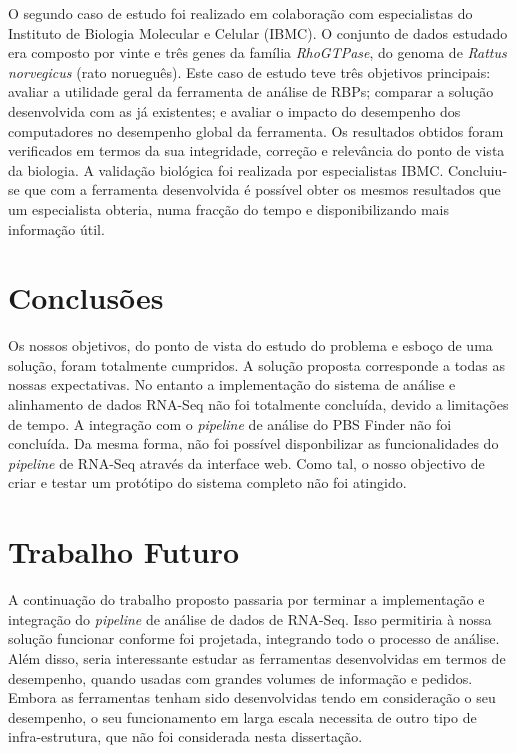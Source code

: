 \documentclass[9pt,a4paper]{extarticle}
\begin{document}
\begin{multicols}{2}
O segundo caso de estudo foi realizado em colaboração com especialistas do
Instituto de Biologia Molecular e Celular (IBMC). O conjunto de dados estudado
era composto por vinte e três genes da família \emph{RhoGTPase}, do genoma de
\emph{Rattus norvegicus} (rato norueguês). Este caso de estudo teve três
objetivos principais: avaliar a utilidade geral da ferramenta de análise de
RBPs; comparar a solução desenvolvida com as já existentes; e avaliar o impacto
do desempenho dos computadores no desempenho global da ferramenta. Os resultados
obtidos foram verificados em termos da sua integridade,  correção e relevância
do ponto de vista da biologia. A validação biológica foi realizada por
especialistas IBMC. Concluiu-se que com a ferramenta desenvolvida é possível
obter os mesmos resultados que um especialista obteria, numa fracção do tempo e
disponibilizando mais informação útil.

\section{Conclusões}

Os nossos objetivos, do ponto de vista do estudo do problema e esboço de uma
solução, foram totalmente cumpridos. A solução proposta corresponde a todas as
nossas expectativas. No entanto a implementação do sistema de análise e
alinhamento de dados RNA-Seq não foi totalmente concluída, devido a limitações
de tempo. A integração com o \emph{pipeline} de análise do PBS Finder não foi
concluída. Da mesma forma, não foi possível disponbilizar as funcionalidades do
\emph{pipeline} de RNA-Seq através da interface web. Como tal, o nosso objectivo
de criar e testar um protótipo do sistema completo não foi atingido.

\section{Trabalho Futuro}

A continuação do trabalho proposto passaria por terminar a implementação e
integração do \emph{pipeline} de análise de dados de RNA-Seq. Isso permitiria à
nossa solução funcionar conforme foi projetada, integrando todo o processo de
análise. Além disso, seria interessante estudar as ferramentas desenvolvidas em
termos de desempenho, quando usadas com grandes volumes de informação e pedidos.
Embora as ferramentas tenham sido desenvolvidas tendo em consideração o seu
desempenho, o seu funcionamento em larga escala necessita de outro tipo de
infra-estrutura, que não foi considerada nesta dissertação.



\end{multicols}
\end{document}

